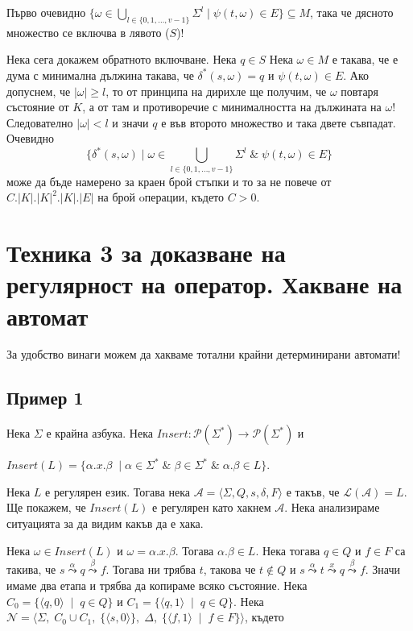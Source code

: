\documentclass[12pt]{article}
\begin{document}
Първо очевидно \(\{ \omega \in  \displaystyle\bigcup_{l \in \{0, 1, \dots, v - 1\}} \Sigma^l \mid \psi(t, \omega) \in E\} \subseteq M\), така че дясното множество се включва в лявото (\(S\))!

Нека сега докажем обратното включване. Нека \(q \in S\) Нека \(\omega \in M\) е такава, че е дума с минимална дължина такава, че \(\delta^*(s, \omega) = q\) и \(\psi(t, \omega) \in E\). Ако допуснем, че \(|\omega| \geq l\), то от принципа на дирихле ще получим, че \(\omega\) повтаря състояние от \(K\), а от там и противоречие с минималността на дължината на \(\omega\)! Следователно \(|\omega| < l\) и значи \(q\) е във второто множество и така двете съвпадат. \\

Очевидно \[\{\delta^*(s, \omega) \mid \omega \in \displaystyle\bigcup_{l \in \{0, 1, \dots, v - 1\}} \Sigma^l \;\&\; \psi(t, \omega) \in E \}\] може да бъде намерено за краен брой стъпки и то за не повече от \(C.|K|.|K|^2.|K|.|E|\) на брой oперации, където \(C > 0\).

\section*{Техника 3 за доказване на регулярност на оператор. Хакване на автомат}
За удобство винаги можем да хакваме тотални крайни детерминирани автомати!

\subsection*{Пример 1}
Нека \(\Sigma\) е крайна азбука.
Нека \(Insert : \mathcal{P}(\Sigma^*) \to \mathcal{P}(\Sigma^*)\) и

\(Insert(L) = \{\alpha.x.\beta \;\mid \alpha \in \Sigma^* \;\&\; \beta \in \Sigma^* \;\&\; \alpha.\beta \in L\}\).

Нека \(L\) е регулярен език. Тогава нека \(\mathcal{A} = \langle \Sigma, Q, s, \delta, F \rangle\) е такъв, че \(\mathcal{L}(\mathcal{A}) = L\). Ще покажем, че \(Insert(L)\) е регулярен като хакнем \(\mathcal{A}\).
Нека анализираме ситуацията за да видим какъв да е хака.

Нека \(\omega \in Insert(L)\) и \(\omega = \alpha.x.\beta\). Тогава \(\alpha.\beta \in L\).
Нека тогава \(q \in Q\) и \(f \in F\) са такива, че  \(s \overset{\alpha}{\leadsto} q \overset{\beta}{\leadsto} f\).
Тогава ни трябва \(t\), такова че \(t \notin Q\) и \(s \overset{\alpha}{\leadsto} t \overset{x}{\leadsto} q \overset{\beta}{\leadsto} f\).
Значи имаме два етапа и трябва да копираме всяко състояние.
Нека \(C_0 = \{\langle q, 0 \rangle \;\mid\; q \in Q\}\) и \(C_1 = \{\langle q, 1 \rangle \;\mid\; q \in Q\}\).
Нека \(\mathcal{N} = \langle \Sigma,\; C_0 \cup C_1,\; \{\langle s, 0 \rangle\},\; \Delta,\; \{ \langle f, 1 \rangle \;\mid\; f \in F\} \rangle \), където
\end{document}
